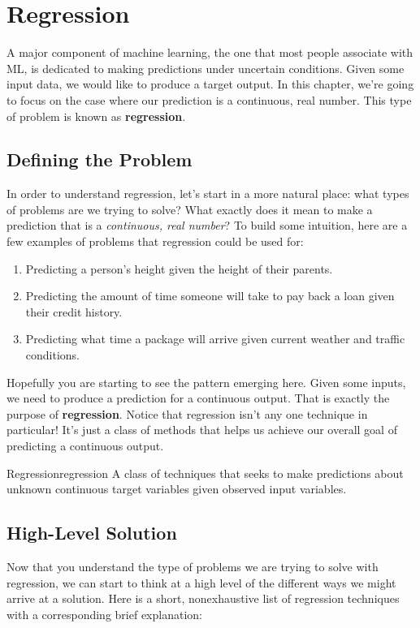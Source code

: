 \chapter{Regression}
A major component of machine learning, the one that most people associate with ML, is dedicated to making predictions under uncertain conditions. Given some input data, we would like to produce a target output. In this chapter, we're going to focus on the case where our prediction is a continuous, real number. This type of problem is known as \textbf{regression}.

\section{Defining the Problem}
In order to understand regression, let's start in a more natural place: what types of problems are we trying to solve? What exactly does it mean to make a prediction that is a \textit{continuous, real number}? To build some intuition, here are a few examples of problems that regression could be used for:

\begin{enumerate}
    \item Predicting a person's height given the height of their parents.
    \item Predicting the amount of time someone will take to pay back a loan given their credit history.
    \item Predicting what time a package will arrive given current weather and traffic conditions.
\end{enumerate}

Hopefully you are starting to see the pattern emerging here. Given some inputs, we need to produce a prediction for a continuous output. That is exactly the purpose of \textbf{regression}. Notice that regression isn't any one technique in particular! It's just a class of methods that helps us achieve our overall goal of predicting a continuous output.

\begin{definition}{Regression}{regression}
A class of techniques that seeks to make predictions about unknown continuous target variables given observed input variables.
\end{definition}

\section{High-Level Solution}
Now that you understand the type of problems we are trying to solve with regression, we can start to think at a high level of the different ways we might arrive at a solution. Here is a short, nonexhaustive list of regression techniques with a corresponding brief explanation:

